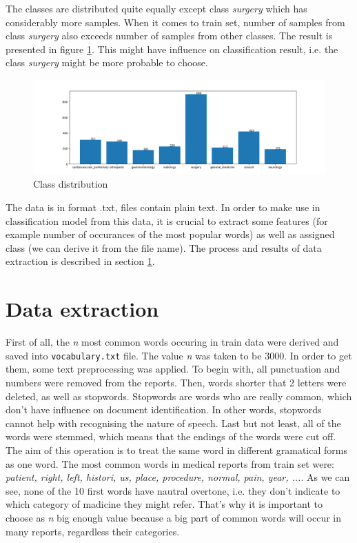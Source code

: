 \documentclass{article}
\begin{document}
The classes are distributed quite equally except class \textit{surgery} which has considerably more samples. When it comes to train set, number of samples from class \textit{surgery} also exceeds number of samples from other classes. The result is presented in figure \ref{fig:class_train_distr}. This might have influence on classification result, i.e. the class \textit{surgery} might be more probable to choose.

\begin{figure}[!ht]
    \centering
    \includegraphics[width=\textwidth]{images/classes_train_distr.png}
    \caption{Class distribution}
    \label{fig:class_train_distr}
\end{figure}

The data is in format .txt, files contain plain text. In order to make use in classification model from this data, it is crucial to extract some features (for example number of occurances of the most popular words) as well as assigned class (we can derive it from the file name). The process and results of data extraction is described in section \ref{section:data_extraction}.


\section{Data extraction}
\label{section:data_extraction}
First of all, the \textit{n} most common words occuring in train data were derived and saved into \texttt{vocabulary.txt} file. The value \textit{n} was taken to be 3000. In order to get them, some text preprocessing was applied. To begin with, all punctuation and numbers were removed from the reports. Then, words shorter that 2 letters were deleted, as well as stopwords. Stopwords are words who are really common, which don't have influence on document identification. In other words, stopwords cannot help with recognising the nature of speech. Last but not least, all of the words were stemmed, which means that the endings of the words were cut off. The aim of this operation is to treat the same word in different gramatical forms as one word. The most common words in medical reports from train set were: \textit{patient, right, left, histori, us, place, procedure, normal, pain, year, ...}. As we can see, none of the 10 first words have nautral overtone, i.e. they don't indicate to which category of madicine they might refer. That's why it is important to choose as \textit{n} big enough value because a big part of common words will occur in many reports, regardless their categories.
\end{document}
